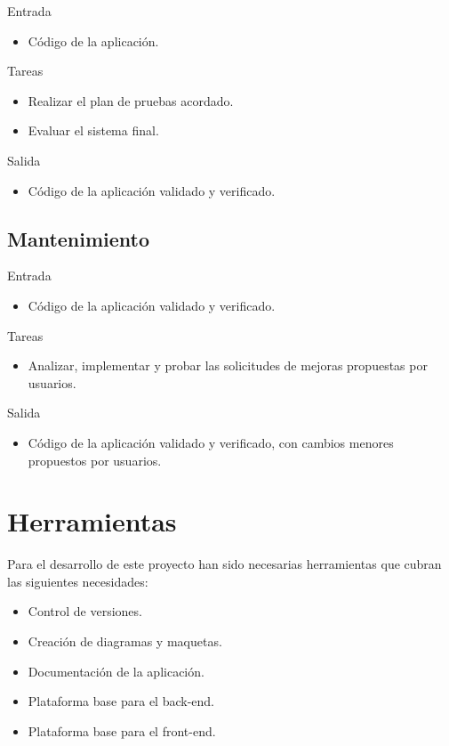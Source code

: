 Entrada
\begin{itemize}[leftmargin=3.5em]
  \item Código de la aplicación.
\end{itemize}

Tareas
\begin{itemize}[leftmargin=3.5em]
  \item Realizar el plan de pruebas acordado.
  \item Evaluar el sistema final.
\end{itemize}

Salida
\begin{itemize}[leftmargin=3.5em]
  \item Código de la aplicación validado y verificado.
\end{itemize}

\subsection*{Mantenimiento\label{ssec:dp:mantenimiento}}

Entrada
\begin{itemize}[leftmargin=3.5em]
  \item Código de la aplicación validado y verificado.
\end{itemize}

Tareas
\begin{itemize}[leftmargin=3.5em]
  \item Analizar, implementar y probar las solicitudes de mejoras propuestas por usuarios.
\end{itemize}

Salida
\begin{itemize}[leftmargin=3.5em]
  \item Código de la aplicación validado y verificado, con cambios menores propuestos por usuarios.
\end{itemize}


\section{Herramientas\label{sec:dp:herramientas}}

Para el desarrollo de este proyecto han sido necesarias herramientas que cubran las siguientes necesidades:

\begin{itemize}
  \item Control de versiones.
  \item Creación de diagramas y maquetas.
  \item Documentación de la aplicación.
  \item Plataforma base para el \gls{back-end}.
  \item Plataforma base para el \gls{front-end}.
\end{itemize}

